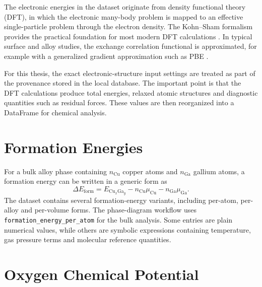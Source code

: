 \documentclass[12pt,a4paper,oneside]{report}
\begin{document}
The electronic energies in the dataset originate from density functional theory
(DFT), in which the electronic many-body problem is mapped to an effective
single-particle problem through the electron density. The Kohn--Sham formalism
provides the practical foundation for most modern DFT calculations
\cite{kohn1965self}. In typical surface and alloy studies, the exchange
correlation functional is approximated, for example with a generalized gradient
approximation such as PBE \cite{perdew1996generalized}.

For this thesis, the exact electronic-structure input settings are treated as
part of the provenance stored in the local database. The important point is that
the DFT calculations produce total energies, relaxed atomic structures and
diagnostic quantities such as residual forces. These values are then reorganized
into a DataFrame for chemical analysis.

\section{Formation Energies}

For a bulk alloy phase containing $n_{\mathrm{Cu}}$ copper atoms and
$n_{\mathrm{Ga}}$ gallium atoms, a formation energy can be written in a generic
form as
\begin{equation}
  \Delta E_\mathrm{form}
  =
  E_{\mathrm{Cu}_x\mathrm{Ga}_y}
  -
  n_{\mathrm{Cu}}\mu_{\mathrm{Cu}}
  -
  n_{\mathrm{Ga}}\mu_{\mathrm{Ga}}.
\end{equation}
The dataset contains several formation-energy variants, including per-atom,
per-alloy and per-volume forms. The phase-diagram workflow uses
\texttt{formation\_energy\_per\_atom} for the bulk analysis. Some entries are
plain numerical values, while others are symbolic expressions containing
temperature, gas pressure terms and molecular reference quantities.

\section{Oxygen Chemical Potential}
\end{document}
